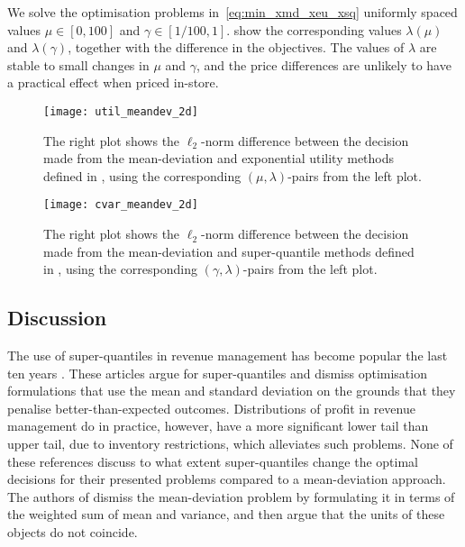 \documentclass[main.tex]{subfiles}
\begin{document}
\begin{example}
  We solve the optimisation problems in~\eqref{eq:min_xmd_xeu_xsq}
  uniformly spaced values $\mu\in[0,100]$ and $\gamma\in[1/100, 1]$.
   show the
  corresponding values $\lambda(\mu)$ and $\lambda(\gamma)$, together
  with the difference in the objectives. The values of $\lambda$
  are stable to small changes in $\mu$ and $\gamma$, and the
  price differences are unlikely to have a practical effect when
  priced in-store.
  \begin{figure}[htbp]
    \centering
    \texttt{[image: util\_meandev\_2d]}
    \caption{The right plot shows the $\ell_2$-norm difference between the decision made
      from the mean-deviation and exponential utility methods defined in
      , using the corresponding
      $(\mu,\lambda)$-pairs from the left plot.
    }\label{fig:util_meandev_2d}
  \end{figure}

  \begin{figure}[hbtp]
    \centering
    \texttt{[image: cvar\_meandev\_2d]}
    \caption{The right plot shows the $\ell_2$-norm difference between the decision made
      from the mean-deviation and super-quantile methods defined in
      , using the corresponding
      $(\gamma,\lambda)$-pairs from the left plot.
    }\label{fig:cvar_meandev_2d}
  \end{figure}
\end{example}

\subsection{Discussion}
The use of super-quantiles in revenue management has become popular
the last ten years
\citep{wu2014risk,xue2015optimal,zhou2008optimal,ahmed2007coherent}.
These articles argue for super-quantiles and dismiss
optimisation formulations that use the mean and standard deviation
on the grounds that they penalise better-than-expected outcomes.
Distributions of profit in revenue management do in practice, however,
have a more significant lower tail than upper tail, due to inventory
restrictions, which alleviates such problems.
None of these references discuss to what extent super-quantiles change the
optimal decisions for their presented problems compared to a
mean-deviation approach.
The authors of \citep{choi2011multiproduct}
dismiss the mean-deviation
problem by formulating it in terms of the weighted sum of mean and
variance, and then argue that the units of these objects do not
coincide.
\end{document}

